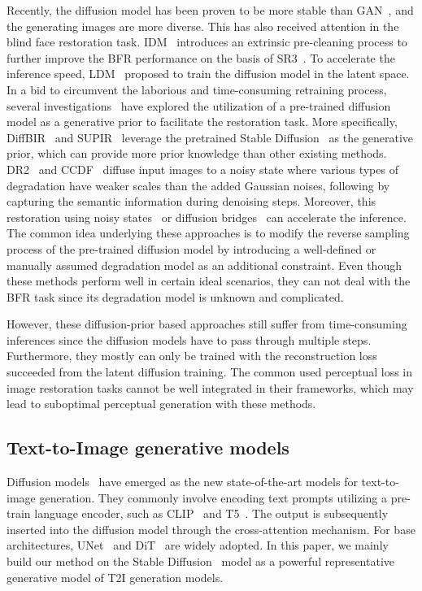 \vspace{-1mm}
Recently, the diffusion model has been proven to be more
stable than GAN~\citep{dhariwal2021diffusionbeatgans}, and the generating images are more diverse. This has also received attention in the blind face restoration task.
IDM~\citep{Zhao_2023_authentic_bfr} introduces an extrinsic pre-cleaning process to further improve the BFR performance on the basis of SR3~\citep{saharia2022image_sr3}.
To accelerate the inference speed, LDM~\citep{rombach2022high} proposed to train the diffusion model in the latent space. In a bid to circumvent the laborious and time-consuming retraining process, several investigations~\citep{lin2023diffbir,wang2023dr2} have explored the utilization of a pre-trained diffusion model as a generative prior to facilitate the restoration task.
More specifically, 
DiffBIR~\citep{lin2023diffbir} and SUPIR~\citep{yu2024scaling} leverage the pretrained Stable Diffusion~\citep{rombach2022high} as the generative prior, which can provide more prior knowledge than other existing methods.
DR2~\citep{wang2023dr2} and CCDF~\citep{chung2022come} diffuse input images to a noisy state where various types of degradation have weaker scales than the added Gaussian noises, following by capturing the semantic information during denoising steps. 
Moreover, this restoration using noisy states~\citep{wang2023dr2,chung2022come} or diffusion bridges~\citep{liu20232} can accelerate the inference. 
The common idea underlying these approaches is to modify the reverse sampling process of the pre-trained diffusion model by introducing a well-defined or manually assumed degradation model as an additional constraint. Even though these methods perform well in certain ideal scenarios, they can not deal with the BFR task since its degradation model is unknown and complicated. 

However, these diffusion-prior based approaches still suffer from time-consuming inferences since the diffusion models have to pass through multiple steps. Furthermore, they mostly can only be trained with the reconstruction loss succeeded from the latent diffusion training. The common used perceptual loss in image restoration tasks cannot be well integrated in their frameworks, which may lead to suboptimal perceptual generation with these methods.


\vspace{-2mm}
\subsection{Text-to-Image generative models}
Diffusion models~\citep{deepfloyd,ho2022imagen,chen2023pixartalpha} have emerged as the new state-of-the-art models for text-to-image generation. They commonly involve encoding text prompts utilizing a pre-train language encoder, such as CLIP~\citep{radford2021clip} and T5~\citep{raffel2020t5_model}.
The output is subsequently inserted into the diffusion model through the cross-attention mechanism. For base architectures, UNet~\citep{ronneberger2015unet} and DiT~\citep{peebles2023scalable_dit} are widely adopted.
In this paper, we mainly build our method on the Stable Diffusion~\citep{rombach2022high} model as a powerful representative generative model of T2I generation models.

